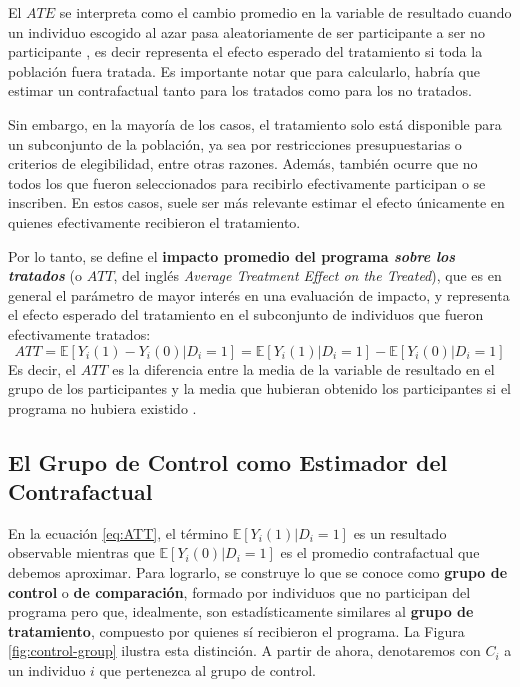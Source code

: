 \documentclass[../../main.tex]{subfiles}
\begin{document}
El \(ATE\) se interpreta como el cambio promedio en la variable de resultado cuando un
individuo escogido al azar pasa aleatoriamente de ser participante a ser no participante
\cite{bernal}, es decir representa el efecto esperado del tratamiento si toda la población
fuera tratada. Es importante notar que para calcularlo, habría que estimar un
contrafactual tanto para los tratados como para los no tratados.

Sin embargo, en la mayoría de los casos, el tratamiento solo está disponible para un
subconjunto de la población, ya sea por restricciones presupuestarias o criterios de
elegibilidad, entre otras razones. Además, también ocurre que no todos los que fueron
seleccionados para recibirlo efectivamente participan o se inscriben. En estos casos,
suele ser más relevante estimar el efecto únicamente en quienes efectivamente recibieron
el tratamiento.

Por lo tanto, se define el \textbf{impacto promedio del programa \textit{sobre los
tratados}} (o \(ATT\), del inglés \textit{Average Treatment Effect on the Treated}), que
es en general el parámetro de mayor interés en una evaluación de impacto, y representa el
efecto esperado del tratamiento en el subconjunto de individuos que fueron efectivamente
tratados:
\begin{equation}
    ATT = \mathbb{E} \left[Y_i(1)-Y_i(0)|D_i=1\right] = \mathbb{E} \left[Y_i(1)|D_i=1\right] -
    \mathbb{E} \left[Y_i(0)|D_i=1\right]
    \label{eq:ATT}
\end{equation}
Es decir, el \(ATT\) es la diferencia entre la media de la variable de resultado en el
grupo de los participantes y la media que hubieran obtenido los participantes si el
programa no hubiera existido \cite{bernal}.

\subsection{El Grupo de Control como Estimador del Contrafactual}
En la ecuación \ref{eq:ATT}, el término \(\mathbb{E} \left[Y_i(1)|D_i=1\right]\) es un
resultado observable mientras que \(\mathbb{E} \left[Y_i(0)|D_i=1\right]\) es el promedio
contrafactual que debemos aproximar. Para lograrlo, se construye lo que se conoce como
\textbf{grupo de control} o \textbf{de comparación}, formado por individuos que no
participan del programa pero que, idealmente, son estadísticamente similares
\cite{gertler-2016} al \textbf{grupo de tratamiento}, compuesto por quienes sí recibieron
el programa. La Figura \ref{fig:control-group} ilustra esta distinción. A partir de ahora,
denotaremos con \(C_i\) a un individuo \(i\) que pertenezca al grupo de control.
\end{document}
